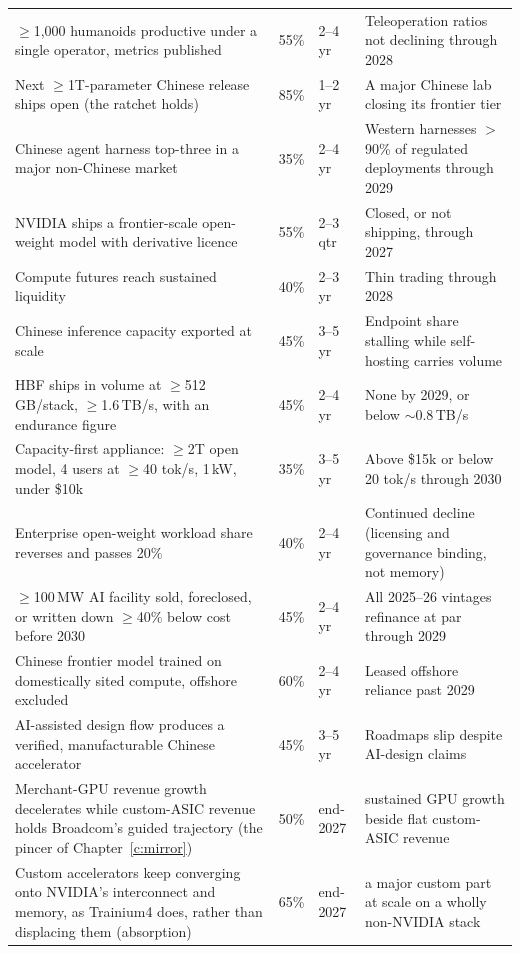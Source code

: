 {\begin{longtable}{@{}p{78mm}p{11mm}p{13mm}p{44mm}@{}}
$\geq$1,000 humanoids productive under a single operator, metrics published & 55\% & 2--4 yr & Teleoperation ratios not declining through 2028 \\
Next $\geq$1T-parameter Chinese release ships open (the ratchet holds) & 85\% & 1--2 yr & A major Chinese lab closing its frontier tier \\
Chinese agent harness top-three in a major non-Chinese market & 35\% & 2--4 yr & Western harnesses $>$90\% of regulated deployments through 2029 \\
NVIDIA ships a frontier-scale open-weight model with derivative licence & 55\% & 2--3 qtr & Closed, or not shipping, through 2027 \\
Compute futures reach sustained liquidity & 40\% & 2--3 yr & Thin trading through 2028 \\
Chinese inference capacity exported at scale & 45\% & 3--5 yr & Endpoint share stalling while self-hosting carries volume \\
HBF ships in volume at $\geq$512\,GB/stack, $\geq$1.6\,TB/s, with an endurance figure & 45\% & 2--4 yr & None by 2029, or below $\sim$0.8\,TB/s \\
Capacity-first appliance: $\geq$2T open model, 4 users at $\geq$40 tok/s, 1\,kW, under \$10k & 35\% & 3--5 yr & Above \$15k or below 20 tok/s through 2030 \\
Enterprise open-weight workload share reverses and passes 20\% & 40\% & 2--4 yr & Continued decline (licensing and governance binding, not memory) \\
$\geq$100\,MW AI facility sold, foreclosed, or written down $\geq$40\% below cost before 2030 & 45\% & 2--4 yr & All 2025--26 vintages refinance at par through 2029 \\
Chinese frontier model trained on domestically sited compute, offshore excluded & 60\% & 2--4 yr & Leased offshore reliance past 2029 \\
AI-assisted design flow produces a verified, manufacturable Chinese accelerator & 45\% & 3--5 yr & Roadmaps slip despite AI-design claims \\
Merchant-GPU revenue growth decelerates while custom-ASIC revenue holds Broadcom's guided trajectory (the pincer of Chapter~\ref{c:mirror}) & 50\% & end-2027 & sustained GPU growth beside flat custom-ASIC revenue \\
Custom accelerators keep converging onto NVIDIA's interconnect and memory, as Trainium4 does, rather than displacing them (absorption) & 65\% & end-2027 & a major custom part at scale on a wholly non-NVIDIA stack \\

\end{longtable}}
